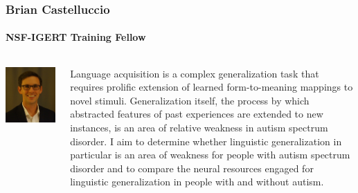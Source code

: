 \documentclass[aspectratio=169]{beamer}
\begin{document}
\begin{frame}
	\frametitle{Brian Castelluccio}
	\framesubtitle{NSF-IGERT Training Fellow}

	\begin{columns}[T]
		\begin{column}{.25\textwidth}
			\includegraphics[width=\textwidth]{img/castelluccio.jpg}
		\end{column}

		\begin{column}{.75\textwidth}
			Language acquisition is a complex generalization task that requires prolific extension of learned form-to-meaning mappings to novel stimuli. Generalization itself, the process by which abstracted features of past experiences are extended to new instances, is an area of relative weakness in autism spectrum disorder. I aim to determine whether linguistic generalization in particular is an area of weakness for people with autism spectrum disorder and to compare the neural resources engaged for linguistic generalization in people with and without autism.
		\end{column}
	\end{columns}
\end{frame}
\end{document}
